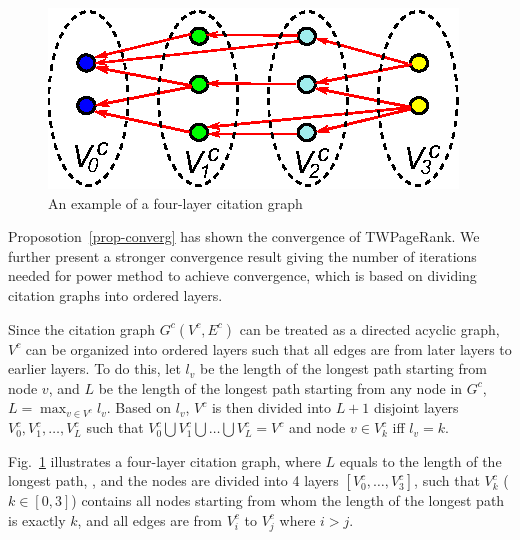 \begin{figure}[tb!]
\centering
\includegraphics[scale=.8]{fig/DAG_Layers.eps}
\vspace{-2ex}
\caption{An example of a four-layer citation graph}
\label{fig-daglayers}
\vspace{-2ex}
\end{figure}


Proposotion~\ref{prop-converg} has shown the convergence of TWPageRank. We further present a stronger convergence result giving the number of iterations needed for power method to achieve convergence, which is based on dividing citation graphs into ordered layers.

Since the citation graph $G^c(V^c,E^c)$ can be treated as a directed acyclic graph, $V^c$ can be organized into ordered layers such that all edges are from later layers to earlier layers. To do this, let $l_v$ be the length of the longest path starting from node $v$,
and $L$ be the length of the longest path starting from any node in $G^c$, \ie $L = \max_{v\in V^c} l_v$. Based on $l_v$,  $V^c$ is then divided into $L+1$ disjoint layers $V^c_0,V^c_1,\dots,V^c_{L}$ such that $V^c_0\bigcup V^c_1 \bigcup \dots \bigcup V^c_{L}=V^c$ and node $v\in V^c_{k}$ iff $l_v=k$. %

\begin{example}
\label{eg-layer-dag}
Fig.~\ref{fig-daglayers} illustrates a four-layer citation graph, where $L$ equals to the length of the longest path, , and the nodes are divided into 4 layers $[V^c_0, \ldots, V^c_3]$, such that $V^c_{k}$ ($k\in[0,3]$) contains all nodes starting from whom the length of the longest path is exactly $k$, and all edges are from  $V^c_i$ to $V^c_j$ where $i>j$.
\end{example}

